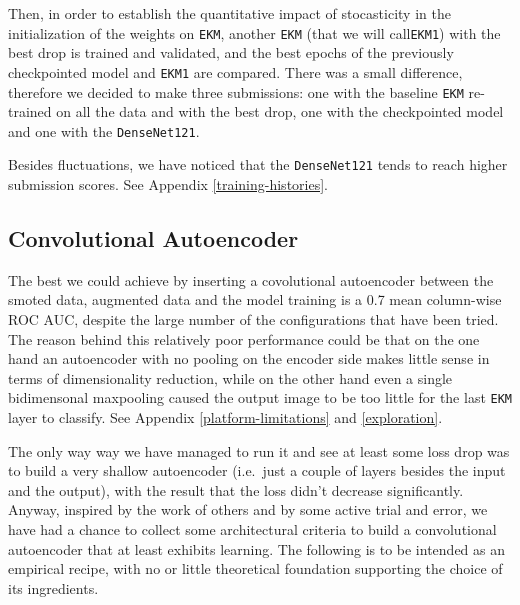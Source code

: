 \documentclass[aps,twocolumn,secnumarabic,nobalancelastpage,amsmath,amssymb,
nofootinbib]{revtex4}
\begin{document}
Then, in order to establish the quantitative impact of stocasticity in
the initialization of the weights on \texttt{EKM}, another \texttt{EKM} (that we will call\texttt{EKM1}) with the best drop is trained and validated, and the best epochs of the previously checkpointed model and \texttt{EKM1} are compared. There was a small difference, therefore we decided to make three submissions: one with the baseline \texttt{EKM} re-trained on all the data and with the best drop, one with the checkpointed model and one with the \texttt{DenseNet121}.

Besides fluctuations, we have noticed that the \texttt{DenseNet121}
tends to reach higher submission scores. See Appendix \ref{training-histories}.

\subsection{Convolutional Autoencoder}\label{ae}

The best we could achieve by inserting a covolutional autoencoder
between the smoted data, augmented data and the model training is a
0.7 mean column-wise ROC AUC, despite the large number of the
configurations that have been tried. The reason behind this relatively
poor performance could be that on the one hand an autoencoder with no
pooling on the encoder side makes little sense in terms of
dimensionality reduction, while on the other hand even a single
bidimensonal maxpooling caused the output image to be too little for the last \texttt{EKM} layer to classify. See Appendix \ref{platform-limitations} and \ref{exploration}. 

The only way way we have managed to run it and see at least some loss
drop was to build a very shallow autoencoder (i.e.~just a couple of
layers besides the input and the output), with the result that the loss
didn't decrease significantly. Anyway, inspired by the work of others
and by some active trial and error, we have had a chance to collect some architectural criteria to build a convolutional autoencoder that at least exhibits learning. The following is to be intended as an empirical recipe, with no or little theoretical foundation supporting the choice of its ingredients. 
\end{document}

